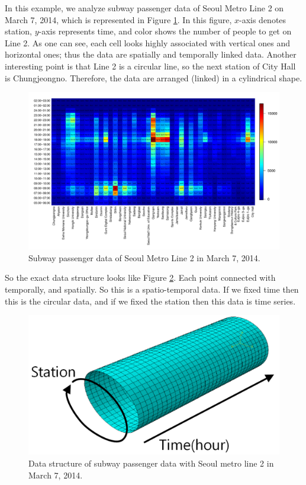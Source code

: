 \documentclass[preprint, review, 12pt]{article}
\theoremstyle{definition}
\theoremstyle{remark}
\begin{document}
In this example, we analyze subway passenger data of Seoul Metro Line 2 on March 7, 2014, which is represented in Figure \ref{snow:subway_in_0}. In this figure, $x$-axis denotes station, $y$-axis represents time, and color shows the number of people to get on Line 2. As one can see, each cell looks highly associated with vertical ones and horizontal ones; thus the data are spatially and temporally linked data. Another interesting point is that Line 2 is a circular line, so the next station of City Hall is Chungjeongno. Therefore, the data are arranged (linked) in a cylindrical shape.

\begin{figure}
	\centering
	\includegraphics[width=1.05\textwidth]{Fig/In_data.pdf}
	\vspace{-13mm}
	\caption{Subway passenger data of Seoul Metro Line 2 in March 7, 2014.}
	\label{snow:subway_in_0}
\end{figure}	

So the exact data structure looks like Figure \ref{snow:datasrt}. Each point connected with temporally, and spatially. So this is a spatio-temporal data. If we fixed time then this is the circular data, and if we fixed the station then this data is time series. 

\begin{figure}
\centering
\includegraphics[width=1\textwidth]{Fig/data_str.png}
\vspace{-13mm}
\caption{Data structure of subway passenger data with Seoul metro line 2 in March 7, 2014.} 
\label{snow:datasrt}
\end{figure}
\end{document}
